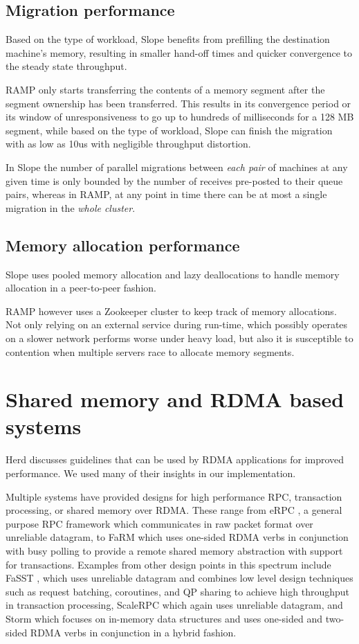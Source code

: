 \subsection{Migration performance}
Based on the type of workload, Slope benefits from prefilling the
destination machine's memory, resulting in smaller hand-off times and
quicker convergence to the steady state throughput.


RAMP only starts transferring the contents of a memory segment after
the segment ownership has been transferred. This results in its
convergence period or its window of unresponsiveness to go up to hundreds
of milliseconds for a 128 MB segment, while based on the type of
workload, Slope can finish the migration with as low as 10us with
negligible throughput distortion.

In Slope the number of parallel migrations between \emph{each pair}
of machines at any given time is only bounded by the number of receives
pre-posted to their queue pairs, whereas in RAMP, at any point in time
there can be at most a single migration in the \emph{whole cluster}.


\subsection{Memory allocation performance}
Slope uses pooled memory allocation and lazy deallocations to handle
memory allocation in a peer-to-peer fashion.

RAMP however uses a Zookeeper cluster to keep track of memory allocations.
Not only relying on an external service during run-time, which possibly
operates on a slower network performs worse under heavy load, but also it
is susceptible to contention when multiple servers race to allocate memory segments.


\section{Shared memory and RDMA based systems}
Herd \cite{kalia2016designguidelines} discusses guidelines that can be
used by RDMA applications for improved performance. We used many of their
insights in our implementation.

Multiple systems have provided designs
for high performance RPC, transaction processing, or shared memory over
RDMA. These range from eRPC \cite{kalia2019datacenter}, a general purpose
RPC framework which communicates in raw packet format over unreliable
datagram, to FaRM \cite{Dragojevic2014FaRM} which uses one-sided RDMA
verbs in conjunction with busy polling to provide a remote shared memory
abstraction with support for transactions. Examples from other design
points in this spectrum include FaSST \cite{kalia2016fasst}, which uses
unreliable datagram and combines low level design techniques such as
request batching, coroutines, and QP sharing to achieve high throughput
in transaction processing, ScaleRPC \cite{ScaleRPC2019} which again uses unreliable datagram,
and Storm \cite{novakovic2019storm} which
focuses on in-memory data structures and uses
one-sided and two-sided RDMA verbs in conjunction in a hybrid fashion.

